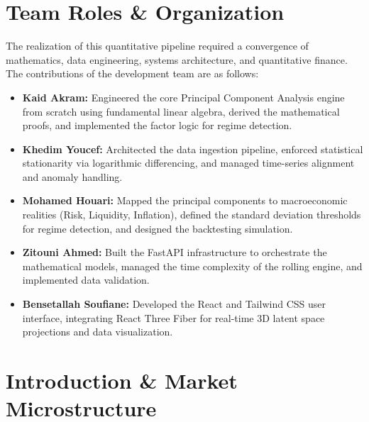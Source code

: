 \documentclass[12pt,twoside]{report}
\begin{document}
\tableofcontents
\newpage

\chapter*{Team Roles \& Organization}
\begin{tcolorbox}[colback=white,colframe=slate!50,arc=3mm,boxrule=1pt,title=\textbf{\large Development Team Contributions},coltitle=white,colbacktitle=deepblue]
The realization of this quantitative pipeline required a convergence of mathematics, data engineering, systems architecture, and quantitative finance. The contributions of the development team are as follows:

\begin{itemize}
    \item \textbf{Kaid Akram:} Engineered the core Principal Component Analysis engine from scratch using fundamental linear algebra, derived the mathematical proofs, and implemented the factor logic for regime detection.
    
    \item \textbf{Khedim Youcef:} Architected the data ingestion pipeline, enforced statistical stationarity via logarithmic differencing, and managed time-series alignment and anomaly handling.
    
    \item \textbf{Mohamed Houari:} Mapped the principal components to macroeconomic realities (Risk, Liquidity, Inflation), defined the standard deviation thresholds for regime detection, and designed the backtesting simulation.
    
    \item \textbf{Zitouni Ahmed:} Built the FastAPI infrastructure to orchestrate the mathematical models, managed the time complexity of the rolling engine, and implemented data validation.
    
    \item \textbf{Bensetallah Soufiane:} Developed the React and Tailwind CSS user interface, integrating React Three Fiber for real-time 3D latent space projections and data visualization.
\end{itemize}
\end{tcolorbox}

\newpage

\chapter{Introduction \& Market Microstructure}
\end{document}
